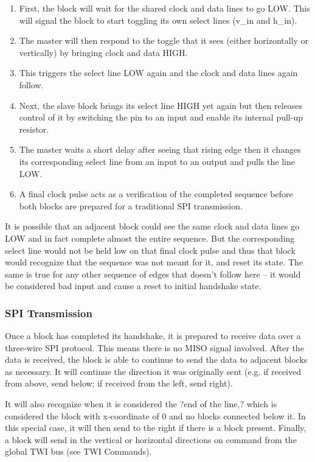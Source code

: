 \documentclass[12pt,a4paper]{article}
\begin{document}
 \begin{enumerate}
 	\item First, the block will wait for the shared clock and data lines to go LOW. This will signal the block to start toggling its own select lines (v\_in and h\_in). 
 	\item The master will then respond to the toggle that it sees (either horizontally or vertically) by bringing clock and data HIGH. 
 	\item This triggers the select line LOW again and the clock and data lines again follow. 
 	\item Next, the slave block brings its select line HIGH yet again but then releases control of it by switching the pin to an input and enable its internal pull-up resistor. 
 	\item The master waits a short delay after seeing that rising edge then it changes its corresponding select line from an input to an output and pulls the line LOW. 
 	\item A final clock pulse acts as a verification of the completed sequence before both blocks are prepared for a traditional SPI transmission.
 \end{enumerate}
 
 It is possible that an adjacent block could see the same clock and data lines go LOW and in fact complete almost the entire sequence. But the corresponding select line would not be held low on that final clock pulse and thus that block would recognize that the sequence was not meant for it, and reset its state. The same is true for any other sequence of edges that doesn't follow here -- it would be considered bad input and cause a reset to initial handshake state.
 \subsubsection{SPI Transmission}
 Once a block has completed its handshake, it is prepared to receive data over a three-wire SPI protocol. This means there is no MISO signal involved. After the data is received, the block is able to continue to send the data to adjacent blocks as necessary. It will continue the direction it was originally sent (e.g. if received from above, send below; if received from the left, send right). 
 
 
 It will also recognize when it is considered the ?end of the line,? which is considered the block with x-coordinate of 0 and no blocks connected below it. In this special case, it will then send to the right if there is a block present. 
 Finally, a block will send in the vertical or horizontal directions on command from the global TWI bus (see TWI Commands). 
 
\end{document}
